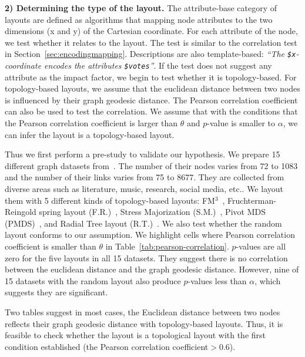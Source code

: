\textbf{2) Determining the type of the layout.} 
The attribute-base category of layouts are defined as algorithms that mapping node attributes to the two dimensions (x and y) of the Cartesian coordinate. 
For each attribute of the node, we test whether it relates to the layout.
The test is similar to the correlation test in Section~\ref{sec:encodingmapping}.
Descriptions are also template-based: \textit{``The \texttt{\$x}-coordinate encodes the attributes \texttt{\$votes}''}.
If the test does not suggest any attribute as the impact factor, we begin to test whether it is topology-based.
For topology-based layouts, we assume that the euclidean distance between two nodes is influenced by their graph geodesic distance.
The Pearson correlation coefficient can also be used to test the correlation.
We assume that with the conditions that the Pearson correlation coefficient is larger than $\theta$ and $p$-value is smaller to $\alpha$, we can infer the layout is a topology-based layout.

Thus we first perform a pre-study to validate our hypothesis.
We prepare 15 different graph datasets from~\cite{DBLP:journals/tvcg/ZhuCHHLZ21}.
The number of their nodes varies from 72 to 1083 and the number of their links varies from 75 to 8677.
They are collected from diverse areas such as literature, music, research, social media, etc..
We layout them with 5 different kinds of topology-based layouts: FM$^3$~\cite{hachul2004drawing}, Fruchterman-Reingold spring layout (F.R.)~\cite{DBLP:journals/spe/FruchtermanR91}, Stress Majorization (S.M.)~\cite{DBLP:conf/gd/GansnerKN04
}, Pivot MDS (PMDS)~\cite{DBLP:conf/gd/BrandesP06}, and Radial Tree layout (R.T.)~\cite{DBLP:conf/infovis/Jankun-KellyM03}.
We also test whether the random layout conforms to our assumption.
We highlight cells where Pearson correlation coefficient is smaller than $\theta$ in Table~\ref{tab:pearson-correlation}.
$p$-values are all zero for the five layouts in all 15 datasets.
They suggest there is no correlation between the euclidean distance and the graph geodesic distance.
However, nine of 15 datasets with the random layout also produce $p$-values less than $\alpha$, which suggests they are significant.

Two tables suggest in most cases, the Euclidean distance between two nodes reflects their graph geodesic distance with topology-based layouts.
Thus, it is feasible to check whether the layout is a topological layout with the first condition established (the Pearson correlation coefficient$>0.6$).

